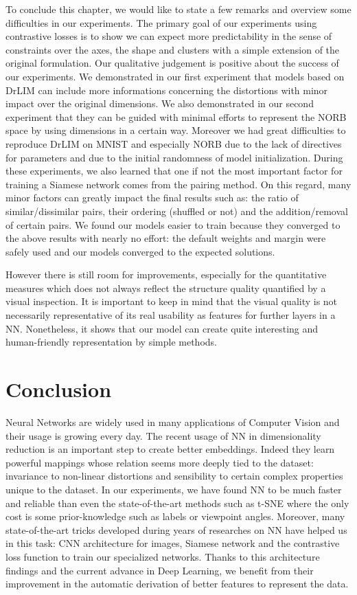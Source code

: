 \documentclass[a4paper,12pt]{report}
\begin{document}
To conclude this chapter, we would like to state a few remarks and overview some difficulties in our experiments.
The primary goal of our experiments using contrastive losses is to show we can expect more predictability in the sense of constraints over the axes, the shape and clusters with a simple extension of the original formulation.
Our qualitative judgement is positive about the success of our experiments.
We demonstrated in our first experiment that models based on DrLIM can include more informations concerning the distortions with minor impact over the original dimensions.
We also demonstrated in our second experiment that they can be guided with minimal efforts to represent the NORB space by using dimensions in a certain way.
Moreover we had great difficulties to reproduce DrLIM on MNIST and especially NORB due to the lack of directives for parameters and due to the initial randomness of model initialization.
During these experiments, we also learned that one if not the most important factor for training a Siamese network comes from the pairing method.
On this regard, many minor factors can greatly impact the final results such as: the ratio of similar/dissimilar pairs, their ordering (shuffled or not) and the addition/removal of certain pairs.
We found our models easier to train because they converged to the above results with nearly no effort: the default weights and margin were safely used and our models converged to the expected solutions.

However there is still room for improvements, especially for the quantitative measures which does not always reflect the structure quality quantified by a visual inspection.
It is important to keep in mind that the visual quality is not necessarily representative of its real usability as features for further layers in a NN.
Nonetheless, it shows that our model can create quite interesting and human-friendly representation by simple methods.


\chapter{Conclusion}
\label{chap:conclusion}

Neural Networks are widely used in many applications of Computer Vision and their usage is growing every day.
The recent usage of NN in dimensionality reduction is an important step to create better embeddings.
Indeed they learn powerful mappings whose relation seems more deeply tied to the dataset: invariance to non-linear distortions and sensibility to certain complex properties unique to the dataset.
In our experiments, we have found NN to be much faster and reliable than even the state-of-the-art methods such as t-SNE where the only cost is some prior-knowledge such as labels or viewpoint angles.
Moreover, many state-of-the-art tricks developed during years of researches on NN have helped us in this task: CNN architecture for images, Siamese network and the contrastive loss function to train our specialized networks.
Thanks to this architecture findings and the current advance in Deep Learning, we benefit from their improvement in the automatic derivation of better features to represent the data.
\end{document}
